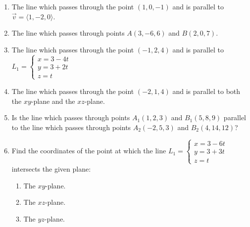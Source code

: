 \documentclass[12pt]{article}
\newif\ifans
\begin{document}
\begin{enumerate}

\item The line which passes through the point $(1,0,-1)$  and is parallel to $\overrightarrow{v}=\langle 1,-2,0\rangle$.

\ifans{\fbox{$x=1+t, y=-2t, z=-1$}} \fi

\item The line which passes through points $A(3,-6,6)$ and $B(2,0,7)$.

\ifans{\fbox{$x=3-t,y=-6+6t,z=6+t$}} \fi

\item The line which passes through the point $(-1,2,4)$ and is parallel to $L_1=\left\{\begin{array}{l}
x=3-4t\\
y=3+2t\\
z=t\end{array}\right.$

\ifans{\fbox{$x=-1-4t,y=2+2t,z=4+t$}} \fi

\item The line which passes through the point $(-2,1,4)$ and is parallel to both the $xy$-plane and the $xz$-plane.

\ifans{\fbox{$x=-2+t,y=1,z=4$}} \fi

\item Is the line which passes through points $A_1(1,2,3)$ and $B_1(5,8,9)$ parallel to the line which passes through points $A_2(-2,5,3)$ and $B_2(4,14,12)$?

\ifans{\fbox{Yes.}} \fi

\item Find the coordinates of the point at which the line $L_1=\left\{\begin{array}{l}
x=3-6t\\
y=3+3t\\
z=t\end{array}\right.$ intersects the given plane:

\begin{enumerate}

\item The $xy$-plane.

\ifans{\fbox{$(x,y,z)=(3,3,0)$}} \fi

\item The $xz$-plane.

\ifans{\fbox{$(x,y,z)=(9,0,-1)$}} \fi

\item The $yz$-plane.


\end{enumerate}
\end{enumerate}
\end{document}

